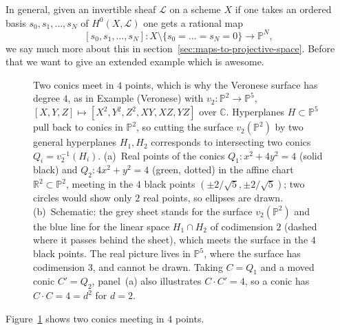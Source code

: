 \documentclass[12pt]{article}
\numberwithin{equation}{section}
\theoremstyle{definition}
\theoremstyle{remark}
\newcommand{\RR}{\mathbb{R}}
\newcommand{\CC}{\mathbb{C}}
\newcommand{\PP}{\mathbb{P}}
\newcommand{\Lcal}{\mathcal{L}}
\begin{document}
In general, given an invertible sheaf $\Lcal$ on a scheme $X$ if one takes an ordered basis $s_0,s_1,\ldots,s_N$ of $H^0(X,\Lcal)$ one gets a rational map
$$ [s_0,s_1,\ldots,s_N]: X\setminus \lbrace s_0=\ldots =s_N=0 \rbrace \to \PP^N,$$
we say much more about this in section~\ref{sec:maps-to-projective-space}.
Before that we want to give an extended example which is awesome.
\begin{figure}[H]
\centering

\caption{Two conics meet in $4$ points, which is why the Veronese surface has degree $4$, as in Example (Veronese) with $v_2\colon\PP^2\to\PP^5$, $[X,Y,Z]\mapsto[X^2,Y^2,Z^2,XY,XZ,YZ]$ over $\CC$. Hyperplanes $H\subset\PP^5$ pull back to conics in $\PP^2$, so cutting the surface $v_2(\PP^2)$ by two general hyperplanes $H_1,H_2$ corresponds to intersecting two conics $Q_i=v_2^{-1}(H_i)$. (a)~Real points of the conics $Q_1\colon x^2+4y^2=4$ (solid black) and $Q_2\colon 4x^2+y^2=4$ (green, dotted) in the affine chart $\RR^2\subset\PP^2$, meeting in the $4$ black points $(\pm2/\sqrt5,\pm2/\sqrt5)$; two circles would show only $2$ real points, so ellipses are drawn. (b)~Schematic: the grey sheet stands for the surface $v_2(\PP^2)$ and the blue line for the linear space $H_1\cap H_2$ of codimension $2$ (dashed where it passes behind the sheet), which meets the surface in the $4$ black points. The real picture lives in $\PP^5$, where the surface has codimension $3$, and cannot be drawn. Taking $C=Q_1$ and a moved conic $C'=Q_2$, panel~(a) also illustrates $C\cdot C'=4$, so a conic has $C\cdot C=4=d^2$ for $d=2$.}\label{fig:two-conics-veronese}
\end{figure}
Figure~\ref{fig:two-conics-veronese} shows two conics meeting in $4$ points.
\end{document}

